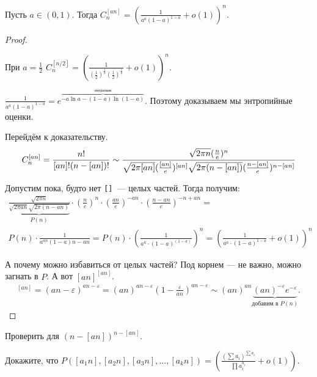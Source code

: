 \begin{Th}
  Пусть $a \in (0, 1)$. Тогда $C_{n}^{[an]} = \left( \frac{1}{a^a(1-a)^{1-a}} + o(1) \right)^n$.
\end{Th}
\begin{proof}
  \begin{remark*}
	При $a=\frac{1}{2}$ $C^{[n/2]}_{n} = \left( \frac1{\left(\frac12 \right)^{\frac12}\left( \frac12 \right)^\frac12} + o(1) \right)^n$.
  \end{remark*}
  \begin{remark*}
	$\frac1{a^a(1-a)^{1-a}} = e^{\overbrace{-a\ln{a} - (1-a)\ln(1-a)}^{\mbox{энтропия}}}$. Поэтому доказываем мы энтропийные оценки.
  \end{remark*}

  Перейдём к доказательству.
  $$
	C_{n}^{[an]} = \frac{n!}{[an]!(n-[an])!} \sim
	\frac{\sqrt{2\pi n}(\frac{n}{e})^n}{\sqrt{2\pi [an]}(\frac{[an]}{e})^{[an]} \sqrt{2\pi (n-[an])}(\frac{n-[an]}{e})^{n-[an]}} \\
  $$

  Допустим пока, будто нет \texttt{[]}~--- целых частей. Тогда получим:
  \begin{multline*}
	\underbrace{\frac{\sqrt{2\pi n}}{\sqrt{2\pi an}\sqrt{2\pi (n-an)}}}_{P(n)} \cdot 
	\left( \frac{n}{e} \right)^n \cdot \left( \frac{an}{e} \right)^{-an} \cdot \left( \frac{n-an}{e} \right)^{-n+an} = \\
	P(n) \cdot \frac{1}{a^{an}(1-a){n-an}} = P(n) \cdot \left( \frac{1}{a^a \cdot (1-a)^(1-a)} \right)^n =
	\left( \frac{1}{a^a \cdot (1-a)^{1-a}} + o(1) \right)^n
  \end{multline*}

  А почему можно избавиться от целых частей? Под корнем --- не важно, можно загнать в $P$. А вот $[an]^{[an]}$.
  \begin{align*}
	[an]^{[an]} = (an-\varepsilon)^{an-\varepsilon} = (an)^{an-\varepsilon}(1-\frac{\varepsilon}{an})^{an-\varepsilon} \sim
	(an)^{an}\underbrace{(an)^{-\varepsilon}e^{-\varepsilon}}_{\mbox{добавим в $P(n)$}}.
  \end{align*}
\end{proof}

\begin{exercise}
  Проверить для $(n-[an])^{n-[an]}$.
\end{exercise}

\begin{exercise}[Важное]
  Докажите, что $P([a_1n], [a_2n], [a_3n], \ldots, [a_kn]) = \left( \frac{(\sum{a_i})^{\sum{a_i}}}{\prod{a_i^{a_i}}} + o(1)\right)$.
\end{exercise}

